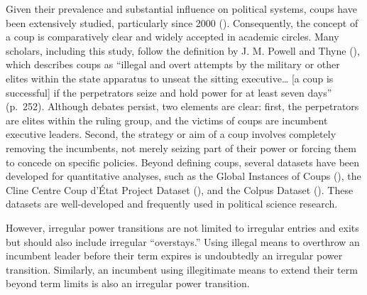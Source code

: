 \documentclass[
  12pt,
]{report}
\begin{document}
Given their prevalence and substantial influence on political systems,
coups have been extensively studied, particularly since 2000
(). Consequently, the
concept of a coup is comparatively clear and widely accepted in academic
circles. Many scholars, including this study, follow the definition by
J. M. Powell and Thyne (), which
describes coups as ``illegal and overt attempts by the military or other
elites within the state apparatus to unseat the sitting
executive\ldots{} {[}a coup is successful{]} if the perpetrators seize
and hold power for at least seven days'' (p.~252). Although debates
persist, two elements are clear: first, the perpetrators are elites
within the ruling group, and the victims of coups are incumbent
executive leaders. Second, the strategy or aim of a coup involves
completely removing the incumbents, not merely seizing part of their
power or forcing them to concede on specific policies. Beyond defining
coups, several datasets have been developed for quantitative analyses,
such as the Global Instances of Coups (), the Cline Centre Coup d'État Project Dataset
(), and the Colpus Dataset
(). These datasets
are well-developed and frequently used in political science research.

However, irregular power transitions are not limited to irregular
entries and exits but should also include irregular ``overstays.'' Using
illegal means to overthrow an incumbent leader before their term expires
is undoubtedly an irregular power transition. Similarly, an incumbent
using illegitimate means to extend their term beyond term limits is also
an irregular power transition.
\end{document}
